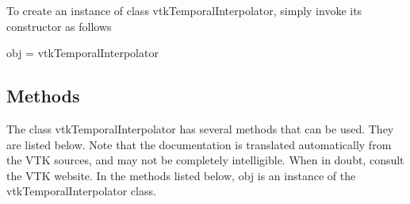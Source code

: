 To create an instance of class vtk\-Temporal\-Interpolator, simply invoke its constructor as follows \begin{DoxyVerb}  obj = vtkTemporalInterpolator
\end{DoxyVerb}
 \hypertarget{vtkwidgets_vtkxyplotwidget_Methods}{}\subsection{Methods}\label{vtkwidgets_vtkxyplotwidget_Methods}
The class vtk\-Temporal\-Interpolator has several methods that can be used. They are listed below. Note that the documentation is translated automatically from the V\-T\-K sources, and may not be completely intelligible. When in doubt, consult the V\-T\-K website. In the methods listed below, {\ttfamily obj} is an instance of the vtk\-Temporal\-Interpolator class. 
